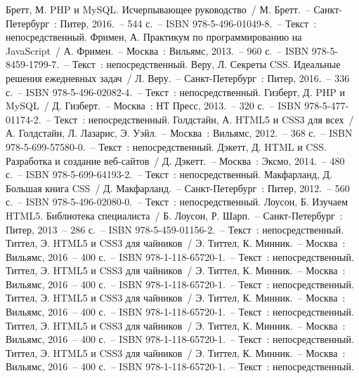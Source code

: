 \newsection
{}

\begin{thebibliography}{9}
     Бретт, М. PHP и MySQL. Исчерпывающее руководство~/ М. Бретт.~– Санкт-Петербург~: Питер, 2016.~– 544 с.~– ISBN 978-5-496-01049-8.~– Текст~: непосредственный.
	 Фримен, А. Практикум по программированию на JavaScript~/ А. Фримен.~– Москва~: Вильямс, 2013.~– 960 с.~– ISBN 978-5-8459-1799-7.~– Текст~: непосредственный.
	 Веру, Л. Секреты CSS. Идеальные решения ежедневных задач~/ Л. Веру.~– Санкт-Петербург~: Питер, 2016.~– 336 с.~– ISBN 978-5-496-02082-4.~– Текст~: непосредственный.
		Гизберт, Д. PHP и MySQL~/ Д. Гизберт.~– Москва~: НТ Пресс, 2013.~– 320 с.~– ISBN 978-5-477-01174-2.~– Текст~: непосредственный.
		Голдстайн, А. HTML5 и CSS3 для всех~/ А. Голдстайн, Л. Лазарис, Э. Уэйл.~– Москва~: Вильямс, 2012.~– 368 с.~– ISBN 978-5-699-57580-0.~– Текст~: непосредственный.
	 Дэкетт, Д. HTML и CSS. Разработка и создание веб-сайтов~/ Д. Дэкетт.~– Москва~: Эксмо, 2014.~– 480 с.~– ISBN 978-5-699-64193-2.~– Текст~: непосредственный.
	 Макфарланд, Д. Большая книга CSS~/ Д. Макфарланд.~– Санкт-Петербург~: Питер, 2012.~– 560 с.~– ISBN 978-5-496-02080-0.~– Текст~: непосредственный.
	 Лоусон, Б. Изучаем HTML5. Библиотека специалиста~/ Б. Лоусон, Р. Шарп.~– Санкт-Петербург~: Питер, 2013~– 286 с.~– ISBN 978-5-459-01156-2.~– Текст~: непосредственный.
	 Титтел, Э. HTML5 и CSS3 для чайников~/ Э. Титтел, К. Минник.~– Москва~: Вильямс, 2016~– 400 с.~– ISBN 978-1-118-65720-1.~– Текст~: непосредственный.
	 Титтел, Э. HTML5 и CSS3 для чайников~/ Э. Титтел, К. Минник.~– Москва~: Вильямс, 2016~– 400 с.~– ISBN 978-1-118-65720-1.~– Текст~: непосредственный.
	 Титтел, Э. HTML5 и CSS3 для чайников~/ Э. Титтел, К. Минник.~– Москва~: Вильямс, 2016~– 400 с.~– ISBN 978-1-118-65720-1.~– Текст~: непосредственный.
	 Титтел, Э. HTML5 и CSS3 для чайников~/ Э. Титтел, К. Минник.~– Москва~: Вильямс, 2016~– 400 с.~– ISBN 978-1-118-65720-1.~– Текст~: непосредственный.
	 Титтел, Э. HTML5 и CSS3 для чайников~/ Э. Титтел, К. Минник.~– Москва~: Вильямс, 2016~– 400 с.~– ISBN 978-1-118-65720-1.~– Текст~: непосредственный.
\end{thebibliography}

